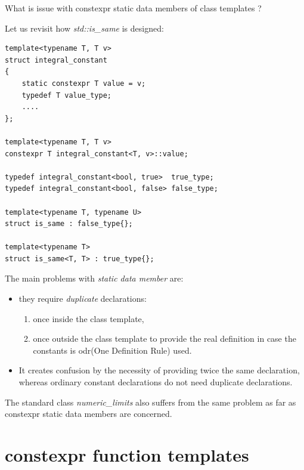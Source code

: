 \begin{Exercise}[title={\small Constexpr static data members of class templates}, difficulty=3, label=ex02]
What is issue with constexpr static data members of class templates ?
\end{Exercise}


\begin{Answer}[ref=ex02]
Let us revisit how \emph{std::is\_same} is designed:

\begin{lstlisting}
template<typename T, T v>
struct integral_constant 
{
    static constexpr T value = v;
    typedef T value_type;
    ....
};

template<typename T, T v>
constexpr T integral_constant<T, v>::value;

typedef integral_constant<bool, true>  true_type;
typedef integral_constant<bool, false> false_type;

template<typename T, typename U>
struct is_same : false_type{};

template<typename T>
struct is_same<T, T> : true_type{};
\end{lstlisting}

The main problems with \emph{static data member} are:
\begin{itemize}
    \item they require \emph{duplicate} declarations: 
    \begin{enumerate}
        \item once inside the class template, 
        \item once outside the class template to provide the real definition in case the constants is odr(One Definition Rule) used.
    \end{enumerate}
    \item It creates confusion by the necessity of providing twice the same declaration, whereas ordinary constant declarations do not need duplicate declarations.
\end{itemize}

The standard class \emph{numeric\_limits} also suffers from the same problem as far as constexpr static data members are concerned.

\end{Answer}



\section{constexpr function templates}

